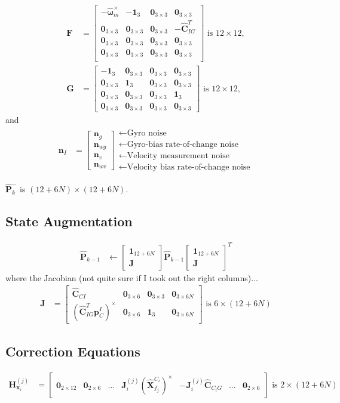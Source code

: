 \documentclass[10pt,letterpaper,fleqn,oneside]{article}
\newcommand{\nl}{\\[0.5em]}
\def\Vec#1{\mathbf{#1}} %
\newcommand{\bbm}{\begin{bmatrix}}
\newcommand{\ebm}{\end{bmatrix}}
\begin{document}
\begin{align}
\Vec{F} &= \bbm	-\hat{\boldsymbol{\omega}}_m^\times & -\Vec{1}_3 & \Vec{0}_{3\times3} & \Vec{0}_{3\times3} \nl
					\Vec{0}_{3\times3} & \Vec{0}_{3\times3} & \Vec{0}_{3\times3} & -\hat{\Vec{C}}_{I G}^T \nl
					\Vec{0}_{3\times3} & \Vec{0}_{3\times3} & \Vec{0}_{3\times3} & \Vec{0}_{3\times3} \nl
					\Vec{0}_{3\times3} & \Vec{0}_{3\times3} & \Vec{0}_{3\times3} & \Vec{0}_{3\times3} \nl
		\ebm \text{ is } 12\times12, \nl
\Vec{G} &= 	\bbm	-\Vec{1}_3 & \Vec{0}_{3\times3} & \Vec{0}_{3\times3} & \Vec{0}_{3\times3} \nl
								\Vec{0}_{3\times3} & \Vec{1}_3 & \Vec{0}_{3\times3} & \Vec{0}_{3\times3} \nl
								\Vec{0}_{3\times3} & \Vec{0}_{3\times3} & \Vec{0}_{3\times3} & \Vec{1}_3 \nl
								\Vec{0}_{3\times3} & \Vec{0}_{3\times3} & \Vec{0}_{3\times3} & \Vec{0}_{3\times3}
					\ebm \text{ is } 12\times12,
\end{align}
and
\begin{align}
\Vec{n}_I &= \bbm \Vec{n}_g \nl \Vec{n}_{wg} \nl \Vec{n}_v \nl \Vec{n}_{wv} \ebm
					\begin{array}{l}
					\leftarrow \text{Gyro noise} \nl
					\leftarrow \text{Gyro-bias rate-of-change noise} \nl
					\leftarrow \text{Velocity measurement noise} \nl
					\leftarrow \text{Velocity bias rate-of-change noise}
					\end{array}		
\end{align}

$\hat{\Vec{P}}^-_k$ is $(12+6N)\times(12+6N)$.

\subsection{State Augmentation}
\begin{align}
\hat{\Vec{P}}_{k-1} &\leftarrow \bbm \Vec{1}_{12+6N}  \nl \Vec{J}\ebm \hat{\Vec{P}}_{k-1} \bbm \Vec{1}_{12+6N}  \nl \Vec{J}\ebm^T
\end{align}
where the Jacobian (not quite sure if I took out the right columns)...
\begin{align}
\Vec{J} &= \bbm \hat{\Vec{C}}_{C I} & \Vec{0}_{3\times6} & \Vec{0}_{3\times3} & \Vec{0}_{3\times6N} \nl
							\left(\hat{\Vec{C}}_{I G}^T \left.\Vec{p}^I_C\right.\right)^\times & \Vec{0}_{3\times6} & \Vec{1}_3 & \Vec{0}_{3\times6N}
				\ebm \text{ is } 6\times\left(12 + 6N\right)
\end{align}

\subsection{Correction Equations}
\begin{align}
\Vec{H}^{(j)}_{\Vec{x}_i} &= \bbm \Vec{0}_{2\times12} & \Vec{0}_{2\times6} & \hdots & \Vec{J}^{\left(j\right)}_i \left(\hat{\Vec{X}}^{C_i}_{f_j}\right)^\times & -\Vec{J}^{\left(j\right)}_i \hat{\Vec{C}}_{C_i G} & \hdots & \Vec{0}_{2\times6} \ebm \text{ is } 2\times\left(12 + 6N\right)
\end{align}
\end{document}
